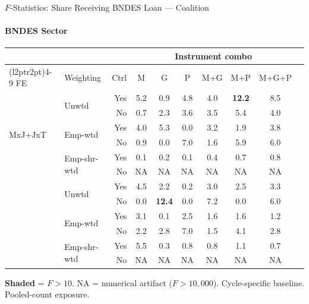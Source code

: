 \documentclass[aspectratio=169,10pt]{beamer}
\newcommand{\fpass}[1]{\cellcolor{pass}\textbf{#1}}
\begin{document}
\begin{frame}[t]{$F$-Statistics: Share Receiving BNDES Loan --- Coalition}
\framesubtitle{BNDES Sector}
\begin{center}
\footnotesize
\setlength{\tabcolsep}{3.5pt}
\renewcommand{\arraystretch}{1.05}
\begin{tabular}{@{}llrccccccc@{}}
\toprule
 & & & \multicolumn{6}{c}{Instrument combo} \\
\cmidrule(l{2pt}r{2pt}){4-9}
FE & Weighting & Ctrl & M & G & P & M+G & M+P & M+G+P \\
\midrule
  \multirow{6}{*}{MxJ+JxT} & \multirow{2}{*}{Unwtd} & Yes & 5.2 & 0.9 & 4.8 & 4.0 & \fpass{12.2} & 8.5 \\
   &  & No & 0.7 & 2.3 & 3.6 & 3.5 & 5.4 & 4.0 \\
   & \multirow{2}{*}{Emp-wtd} & Yes & 4.0 & 5.3 & 0.0 & 3.2 & 1.9 & 3.8 \\
   &  & No & 0.9 & 0.0 & 7.0 & 1.6 & 5.9 & 6.0 \\
   & \multirow{2}{*}{Emp-shr-wtd} & Yes & 0.1 & 0.2 & 0.1 & 0.4 & 0.7 & 0.8 \\
   &  & No & NA & NA & NA & NA & NA & NA \\
\addlinespace[5pt]
  \multirow{6}{*}{MxJ+MxT} & \multirow{2}{*}{Unwtd} & Yes & 4.5 & 2.2 & 0.2 & 3.0 & 2.5 & 3.3 \\
   &  & No & 0.0 & \fpass{12.4} & 0.0 & 7.2 & 0.0 & 6.0 \\
   & \multirow{2}{*}{Emp-wtd} & Yes & 3.1 & 0.1 & 2.5 & 1.6 & 1.6 & 1.2 \\
   &  & No & 2.2 & 2.8 & 7.0 & 1.5 & 4.1 & 2.8 \\
   & \multirow{2}{*}{Emp-shr-wtd} & Yes & 5.5 & 0.3 & 0.8 & 0.8 & 1.1 & 0.7 \\
   &  & No & NA & NA & NA & NA & NA & NA \\
\bottomrule
\end{tabular}
\end{center}
{\scriptsize \colorbox{pass}{\textbf{Shaded}} = $F>10$. NA = numerical artifact ($F>10{,}000$). Cycle-specific baseline. Pooled-count exposure.}
\end{frame}
\end{document}
